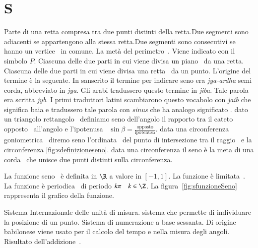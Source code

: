 \chapter{S}
\vspace{5mm} 
Parte di una retta compresa tra due punti distinti della retta.Due segmenti sono adiacenti se appartengono alla stessa retta.Due segmenti sono consecutivi se hanno un vertice\pointsto~ in comune.
La metà del perimetro\pointsto~. Viene indicato con il simbolo $P$.
Ciascuna delle due parti in cui viene divisa un piano\pointsto~ da una retta.
Ciascuna delle due parti in cui viene divisa una retta\pointsto~ da un punto.
L'origine del termine è la seguente. In sanscrito il termine per indicare seno era \textit{jya-ardha} semi corda, abbreviato in \textit{jya}. Gli arabi tradussero questo termine in \textit{jiba}. Tale parola era scritta \textit{jyb}. I primi traduttori latini scambiarono questo vocabolo con \textit{jaib} che significa baia e tradussero tale parola con \textit{sinus} che ha analogo significato \cite{Gheverghese2000}. dato un triangolo rettangolo\pointsto~ definiamo seno dell'angolo il rapporto tra il cateto\pointsto~ opposto\pointsto~ all'angolo e l'ipotenusa\pointsto~ $\sin\beta=\frac{\text{opposto}}{\text{ipotenusa}}$.  data una circonferenza goniometrica\pointsto~ diremo seno l'ordinata\pointsto~ del punto di intersezione tra il raggio\pointsto~ e la circonferenza \vref{fig:sdefinizioneseno}.
 data una circonferenza il seno è la meta di una corda\pointsto~ che unisce due punti distinti sulla circonferenza. 
\begin{figure}
	\label{fig:sfunzioneSeno}
	
\end{figure}
La funzione seno\pointsto~ è definita in $\R$  a valore in  $[-1,1]$. La funzione  è limitata\pointsto~.
La funzione è periodica\pointsto~  di periodo $k\pi\quad k\in\Z$. La figura~\vref{fig:sfunzioneSeno} rappresenta il grafico della funzione.
\begin{figure}
	\label{fig:sdefinizioneseno}
	
\end{figure}
Sistema Internazionale delle unità di misura.
sistema che permette di individuare la posizione di un punto. 
Sistema di numerazione a base sessanta. Di origine babilonese viene usato per il calcolo del tempo e nella misura degli angoli.
Risultato dell'addizione\pointsto~.